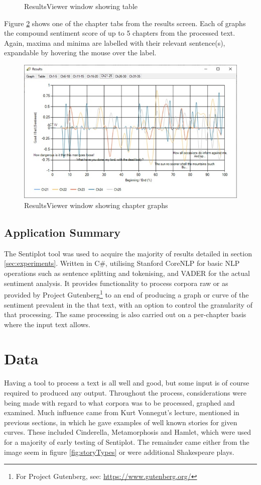 \documentclass{article}
\begin{document}
{\begin{figure}[H]
            \caption{ResultsViewer window showing table}
            \label{fig:resultstable}
        \end{figure}
        Figure \ref{fig:resultschapters} shows one of the chapter tabs from the results screen. Each of graphs the compound sentiment score of up to 5 chapters from the processed text. Again, maxima and minima are labelled with their relevant sentence(s), expandable by hovering the mouse over the label.
        \begin{figure}[htbp]
            \includegraphics[width=1\textwidth]{Figures/Misc/resultschapters}
            \caption{ResultsViewer window showing chapter graphs}
            \label{fig:resultschapters}
        \end{figure}
    \subsection{Application Summary}
        The Sentiplot tool was used to acquire the majority of results detailed in section \ref{sec:experiments}. Written in C\#, utilising Stanford CoreNLP for basic NLP operations such as sentence splitting and tokenising, and VADER for the actual sentiment analysis. It provides functionality to process corpora raw or as provided by Project Gutenberg\footnote{For Project Gutenberg, see: \url{https://www.gutenberg.org/}} to an end of producing a graph or curve of the sentiment prevalent in the that text, with an option to control the granularity of that processing. The same processing is also carried out on a per-chapter basis where the input text allows.
\newpage
\section{Data}
    Having a tool to process a text is all well and good, but some input is of course required to produced any output. Throughout the process, considerations were being made with regard to what corpora was to be processed, graphed and examined. Much influence came from Kurt Vonnegut's lecture, mentioned in previous sections, in which he gave examples of well known stories for given curves. These included Cinderella, Metamorphosis and Hamlet, which were used for a majority of early testing of Sentiplot. The remainder came either from the image seem in figure \ref{fig:storyTypes} or were additional Shakespeare plays.

}
\end{document}
